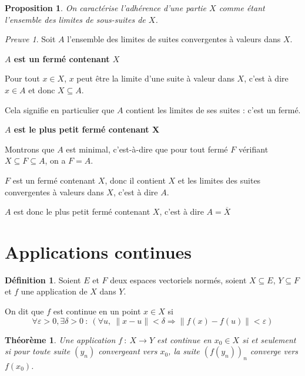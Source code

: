 \documentclass[]{article}
\newtheorem{mythm}{Théorème}
\newtheorem{myproposition}{Proposition}
\theoremstyle{remark}
\newtheorem{myproof}{Preuve}
\theoremstyle{definition}
\newtheorem{mydef}{Définition}
\newenvironment{proofpart}[1]{
	\noindent
	{\textbf{\boldmath #1}}
}{
	\checkmark
}
\begin{document}
\begin{myproposition}
	On caractérise l'adhérence d'une partie $X$ comme étant l'ensemble des limites de sous-suites de $X$.
\end{myproposition}

\begin{myproof}
	Soit $A$ l'ensemble des limites de suites convergentes à valeurs dans $X$.
	
	
	\begin{proofpart}{$A$ est un fermé contenant $X$}
		Pour tout $x \in X$, $x$ peut être la limite d'une suite à valeur dans $X$, c'est à dire $x \in A$ et donc $X \subseteq A$.
		
		Cela signifie en particulier que $A$ contient les limites de ses suites : c'est un fermé.
	\end{proofpart}
	
	\begin{proofpart}{$A$ est le plus petit fermé contenant X}
	
	Montrons que $A$ est minimal, c'est-à-dire que pour tout fermé $F$ vérifiant $X \subseteq F \subseteq A$, on a $F=A$.
	
	$F$ est un fermé contenant $X$, donc il contient $X$ et les limites des suites convergentes à valeurs dans $X$, c'est à dire $A$.
	\end{proofpart}
	
	$A$ est donc le plus petit fermé contenant $X$, c'est à dire $A = \overline{X}$	
\end{myproof}

\section{Applications continues}

\begin{mydef}
	Soient $E$ et $F$ deux espaces vectoriels normés, soient $X \subseteq E$, $Y \subseteq F$ et $f$ une application de $X$ dans $Y$.
	
	On dit que $f$ est continue en un point $x \in X$ si $$\forall \varepsilon > 0, \exists \delta > 0 ~ : ~ (\forall u, ~ \|x-u\| < \delta \Longrightarrow \|f(x)-f(u)\| < \varepsilon)$$
\end{mydef}

\begin{mythm}
	Une application $f~:~X \longrightarrow Y$ est continue en $x_0 \in X$ si et seulement si pour toute suite $(y_n)$ convergeant vers $x_0$, la suite $\left(f(y_n)\right)_n$ converge vers $f(x_0)$.
\end{mythm}
\end{document}
